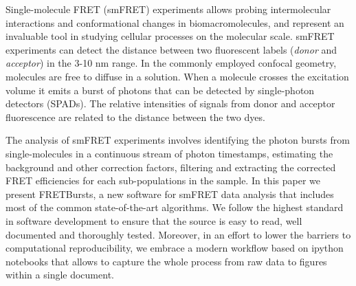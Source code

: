 Single-molecule FRET (smFRET) experiments allows probing intermolecular interactions and conformational changes in biomacromolecules, and represent an invaluable tool in studying cellular processes on the molecular scale\cite{Kapanidis_2006}. smFRET experiments can detect the distance between two fluorescent labels (\textit{donor} and \textit{acceptor}) in the 3-10 nm range. In the commonly employed confocal geometry, molecules are free to diffuse in a solution. When a molecule crosses the excitation volume it emits a burst of photons that can be detected by single-photon detectors (SPADs). 
The relative intensities of signals from donor and acceptor fluorescence are related to the distance between the two dyes.

The analysis of smFRET experiments involves identifying the photon bursts from single-molecules in a continuous stream of photon timestamps, estimating the background and other correction factors, filtering and extracting the corrected FRET efficiencies for each sub-populations in the sample. In this paper we present FRETBursts, a new software for smFRET data analysis that includes most of the common state-of-the-art algorithms. We follow the highest standard in software development to ensure that the source is easy to read, well documented and thoroughly tested. Moreover, in an effort to lower the barriers to computational reproducibility, we embrace a modern workflow based on ipython notebooks that allows to capture the whole process from raw data to figures within a single document.
